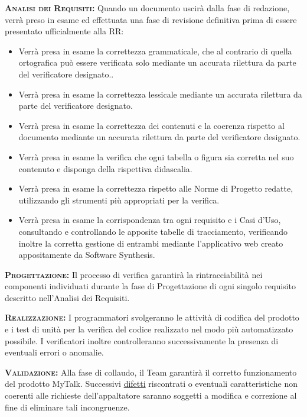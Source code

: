 \begin{description}
	\item{\scshape\bfseries Analisi dei Requisiti:} Quando un documento uscirà dalla fase di redazione, verrà preso in esame ed effettuata una fase di revisione definitiva prima di essere presentato ufficialmente alla RR: 
\begin{itemize}
		\item Verrà presa in esame la correttezza grammaticale, che al contrario di quella ortografica può essere verificata solo mediante un accurata rilettura da parte del verificatore designato..
		\item Verrà presa in esame la correttezza lessicale mediante un accurata rilettura da parte del verificatore designato.
		\item Verrà presa in esame la correttezza dei contenuti e la coerenza rispetto al documento mediante un accurata rilettura da parte del verificatore designato.
		\item Verrà presa in esame la verifica che ogni tabella o figura sia corretta nel suo contenuto e disponga della rispettiva didascalia.
		\item Verrà presa in esame la correttezza rispetto alle Norme di Progetto redatte, utilizzando gli strumenti più appropriati per la verifica.
		\item Verrà presa in esame la corrispondenza tra ogni requisito e i Casi d'Uso, consultando e controllando le apposite tabelle di tracciamento, verificando inoltre la corretta gestione di entrambi mediante l'applicativo web creato appositamente da Software Synthesis.
\end{itemize}
	\item{\scshape\bfseries Progettazione:} Il processo di verifica garantirà la rintracciabilità nei componenti individuati durante la fase di Progettazione di ogni singolo requisito descritto nell'Analisi dei Requisiti.
	\item{\scshape\bfseries Realizzazione:} I programmatori svolgeranno le attività di codifica del prodotto e i test di unità per la verifica del codice realizzato nel modo più automatizzato possibile. I verificatori inoltre controlleranno successivamente la presenza di eventuali errori o anomalie.
	\item{\scshape\bfseries Validazione:} Alla fase di collaudo, il Team garantirà il corretto funzionamento del prodotto MyTalk. Successivi \underline{difetti} riscontrati o eventuali caratteristiche non coerenti alle richieste dell'appaltatore saranno soggetti a modifica e correzione al fine di eliminare tali incongruenze. 
\end{description}
\clearpage
